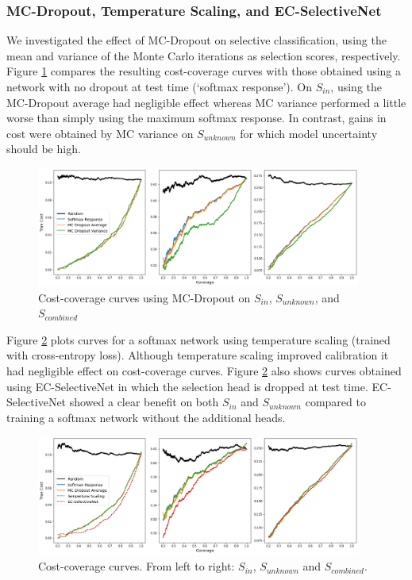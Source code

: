 \subsubsection{MC-Dropout, Temperature Scaling, and EC-SelectiveNet}
We investigated the effect of MC-Dropout on selective classification, using the mean and variance of the Monte Carlo iterations as selection scores, respectively. Figure \ref{fig:mc_dropout} compares the resulting cost-coverage curves with those obtained using a network with no dropout at test time (`softmax response'). On $S_{in}$, using the MC-Dropout average had negligible effect whereas MC variance performed a little worse than simply using the maximum softmax response. In contrast, gains in cost were obtained by MC variance on $S_{unknown}$ for which model uncertainty should be high.
   
\begin{figure}[h]
	\centering
	\includegraphics[width=0.95\textwidth]{images/mc_dropout_v2.png}
	\caption{Cost-coverage curves using MC-Dropout on $S_{in}$, $S_{unknown}$, and $S_{combined}$}
	\label{fig:mc_dropout}
\end{figure}
   
Figure \ref{fig:dataset_splits} plots curves for a softmax network using temperature scaling (trained with cross-entropy loss). Although temperature scaling improved calibration it had negligible effect on cost-coverage curves.  Figure \ref{fig:dataset_splits} also shows curves obtained using EC-SelectiveNet in which the selection head is dropped at test time. EC-SelectiveNet showed a clear benefit on both $S_{in}$ and $S_{unknown}$ compared to training a softmax network without the additional heads.

\begin{figure}[h]
	\centering
	\includegraphics[width=0.95\textwidth]{images/datasets_v2.png}
	\caption{Cost-coverage curves. From left to right: \(S_{in}\), \(S_{unknown}\) and \(S_{combined}\).}
	\label{fig:dataset_splits}
\end{figure}

